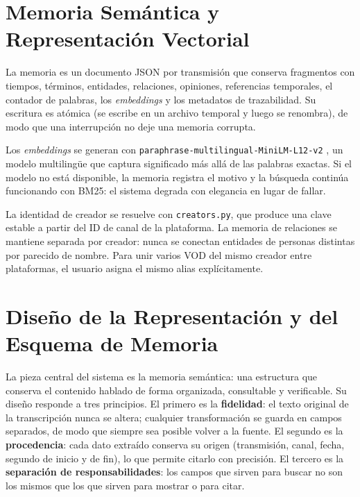 \documentclass[12pt,a4paper]{article}
\begin{document}
\section{Memoria Semántica y Representación Vectorial}
\label{sec:memoria}

La memoria es un documento JSON por transmisión que conserva fragmentos con tiempos, términos, entidades, relaciones, opiniones, referencias temporales, el contador de palabras, los \emph{embeddings} y los metadatos de trazabilidad. Su escritura es atómica (se escribe en un archivo temporal y luego se renombra), de modo que una interrupción no deje una memoria corrupta.


Los \emph{embeddings} se generan con \texttt{paraphrase-multilingual-MiniLM-L12-v2} \cite{sbert}, un modelo multilingüe que captura significado más allá de las palabras exactas. Si el modelo no está disponible, la memoria registra el motivo y la búsqueda continúa funcionando con BM25: el sistema degrada con elegancia en lugar de fallar.

La identidad de creador se resuelve con \texttt{creators.py}, que produce una clave estable a partir del ID de canal de la plataforma. La memoria de relaciones se mantiene separada por creador: nunca se conectan entidades de personas distintas por parecido de nombre. Para unir varios VOD del mismo creador entre plataformas, el usuario asigna el mismo alias explícitamente.


\section{Diseño de la Representación y del Esquema de Memoria}
\label{sec:representacion}

La pieza central del sistema es la memoria semántica: una estructura que conserva el contenido hablado de forma organizada, consultable y verificable. Su diseño responde a tres principios. El primero es la \textbf{fidelidad}: el texto original de la transcripción nunca se altera; cualquier transformación se guarda en campos separados, de modo que siempre sea posible volver a la fuente. El segundo es la \textbf{procedencia}: cada dato extraído conserva su origen (transmisión, canal, fecha, segundo de inicio y de fin), lo que permite citarlo con precisión. El tercero es la \textbf{separación de responsabilidades}: los campos que sirven para buscar no son los mismos que los que sirven para mostrar o para citar.
\end{document}
